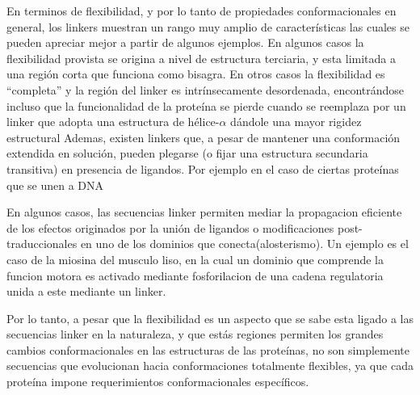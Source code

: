 
En terminos de flexibilidad, y por lo tanto de propiedades conformacionales en general, los linkers muestran un rango muy amplio de características las cuales se pueden apreciar mejor a partir de algunos ejemplos.
En algunos casos la flexibilidad provista se origina a nivel de estructura terciaria, y esta limitada a una región corta que funciona como bisagra.%
En otros casos la flexibilidad es ``completa'' y la región del linker es intrínsecamente desordenada\cite{luo2010flexibility}, 
encontrándose incluso que la funcionalidad de la proteína se pierde cuando se reemplaza por un linker que adopta una estructura de hélice-$\alpha$ dándole una mayor rigidez estructural\cite{hrycyna1998structural}
Ademas, existen linkers que, a pesar de mantener una conformación extendida en solución, pueden plegarse (o fijar una estructura secundaria transitiva) en presencia de ligandos.
Por ejemplo en el caso de ciertas proteínas que se unen a DNA\cite{laity2000dna}


En algunos casos, las secuencias linker permiten mediar la propagacion eficiente de los efectos originados por la unión de ligandos o modificaciones post-traduccionales en uno de los dominios que conecta(alosterismo).
Un ejemplo es el caso de la miosina del musculo liso, en la cual un dominio que comprende la funcion motora es activado mediante fosforilacion  de una cadena regulatoria unida a este mediante un linker\cite{ikebe1998hinge}.






Por lo tanto, a pesar que la flexibilidad es un aspecto que se sabe esta ligado a las secuencias linker en la naturaleza\cite{wriggers2005control}, 
y que estás regiones permiten los grandes cambios conformacionales en las estructuras de las proteínas, 
no son simplemente secuencias que evolucionan hacia conformaciones totalmente flexibles, ya que cada proteína impone requerimientos conformacionales específicos. 

